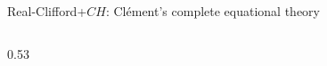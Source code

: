 \begin{frame}{Real-Clifford+$CH$: Clément's complete equational theory \New}
\begin{columns}[c]
\begin{column}{0.53\textwidth}
\begin{code}
\AgdaSpace{}%
\AgdaSpace{}%
\AgdaSpace{}%
\AgdaSpace{}%
\AgdaSpace{}%
\AgdaSpace{}%
\AgdaSpace{}%
\<%
\\
\>[.][@{}l@{}]\<[255I]%
\>[29]\AgdaOperator{\AgdaDatatype{===}}\AgdaSpace{}%
\AgdaSpace{}%
\AgdaSpace{}%
\AgdaSpace{}%
\AgdaSpace{}%
\AgdaSpace{}%
\AgdaSpace{}%
\AgdaSpace{}%
\AgdaSpace{}%
\AgdaSpace{}%
\AgdaSpace{}%
\AgdaSpace{}%
\<%
\\
%
\>[2]%
\>[16]\AgdaSymbol{:}\AgdaSpace{}%
\AgdaSymbol{(}\AgdaSpace{}%
\AgdaSymbol{)}\AgdaSpace{}%
\AgdaSpace{}%
\AgdaSymbol{(}\AgdaSpace{}%
\AgdaSpace{}%
\AgdaSpace{}%
\AgdaSymbol{)}\AgdaSpace{}%
\AgdaOperator{\AgdaPostulate{\textasciicircum{}}}\AgdaSpace{}%
\AgdaSpace{}%
\AgdaOperator{\AgdaDatatype{===}}\AgdaSpace{}%
\AgdaSpace{}%
\<%
\\
%
\>[2]%
\>[16]\AgdaSymbol{:}\AgdaSpace{}%
\AgdaSymbol{(}\AgdaSpace{}%
\AgdaSymbol{)}\AgdaSpace{}%
\AgdaSpace{}%
\AgdaSpace{}%
\AgdaSpace{}%
\AgdaSpace{}%
\AgdaSpace{}%
\AgdaSpace{}%
\AgdaOperator{\AgdaDatatype{===}}\AgdaSpace{}%
\AgdaSpace{}%
\AgdaSpace{}%
\AgdaSpace{}%
\AgdaSpace{}%
\<%
\\
%
\>[2]\AgdaSpace{}%
\AgdaSymbol{:}\AgdaSpace{}%
\AgdaSpace{}%
\AgdaSpace{}%
\AgdaSpace{}%

\end{code}
\end{column}
\end{columns}
\end{frame}
